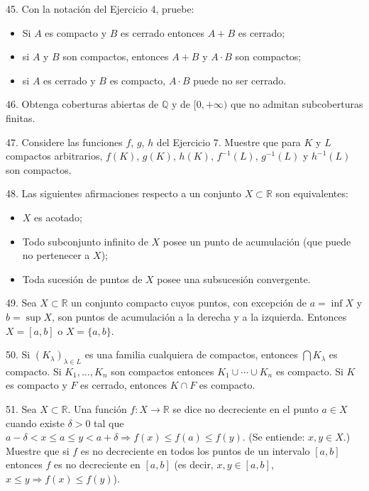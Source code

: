 \documentclass[12pt,oneside]{book}
\begin{document}
45. Con la notación del Ejercicio 4, pruebe:
\begin{itemize}
    \item[a)] Si \(A\) es compacto y \(B\) es cerrado entonces \(A + B\) es cerrado;\\
    \item[b)] si \(A\) y \(B\) son compactos, entonces \(A + B\) y \(A \cdot B\) son compactos;\\
    \item[c)] si \(A\) es cerrado y \(B\) es compacto, \(A \cdot B\) puede no ser cerrado.
\end{itemize}

46. Obtenga coberturas abiertas de \(\mathbb{Q}\) y de \([0, +\infty)\) que no admitan subcoberturas finitas.

47. Considere las funciones \(f\), \(g\), \(h\) del Ejercicio 7. Muestre que para \(K\) y \(L\) compactos arbitrarios, \(f(K)\), \(g(K)\), \(h(K)\), \(f^{-1}(L)\), \(g^{-1}(L)\) y \(h^{-1}(L)\) son compactos.

48. Las siguientes afirmaciones respecto a un conjunto \(X \subset \mathbb{R}\) son equivalentes:
\begin{itemize}
    \item[(1)] \(X\) es acotado;
   \item[(2)] Todo subconjunto infinito de \(X\) posee un punto de acumulación (que puede no pertenecer a \(X\));
   \item[(3)] Toda sucesión de puntos de \(X\) posee una subsucesión convergente.
\end{itemize}

49. Sea \(X \subset \mathbb{R}\) un conjunto compacto cuyos puntos, con excepción de \(a = \inf X\) y \(b = \sup X\), son puntos de acumulación a la derecha y a la izquierda. Entonces \(X = [a, b]\) o \(X = \{a, b\}\).

50. Si \((K_\lambda)_{\lambda \in L}\) es una familia cualquiera de compactos, entonces \(\bigcap K_\lambda\) es compacto. Si \(K_1, \ldots, K_n\) son compactos entonces \(K_1 \cup \cdots \cup K_n\) es compacto. Si \(K\) es compacto y \(F\) es cerrado, entonces \(K \cap F\) es compacto.

51. Sea \(X \subset \mathbb{R}\). Una función \(f: X \to \mathbb{R}\) se dice no decreciente en el punto \(a \in X\) cuando existe \(\delta > 0\) tal que \(a - \delta < x \leq a \leq y < a + \delta \Rightarrow f(x) \leq f(a) \leq f(y)\). (Se entiende: \(x, y \in X\).) Muestre que si \(f\) es no decreciente en todos los puntos de un intervalo \([a, b]\) entonces \(f\) es no decreciente en \([a, b]\) (es decir, \(x, y \in [a, b]\), \(x \leq y \Rightarrow f(x) \leq f(y)\)).
\end{document}
